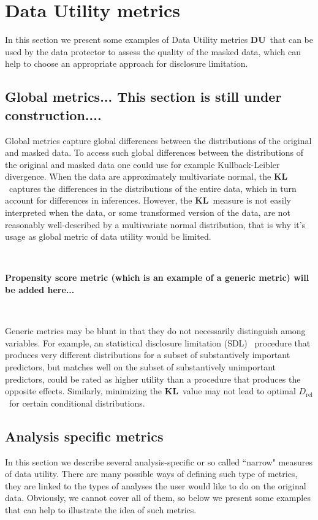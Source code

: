 \documentclass[12pt]{article}
\def\DU{\ensuremath{\mathbf{DU}}} %
\def\DBREL{\ensuremath{D_{\mathrm{rel}}}} %
\def\KL{\ensuremath{\mathbf{KL}}} %
\def\SDL{statistical disclosure limitation (SDL)%
    \gdef\SDL{SDL}}
\begin{document}
\section{ Data Utility metrics} \label{du_metrics}
In this section we present some examples of Data Utility metrics \DU\ that can be used by the data protector to assess the quality of the masked data, which can help to choose an appropriate approach for disclosure limitation.

\subsection{Global metrics... This section is still under construction.... }


Global metrics capture global differences between the distributions of the original and masked
data. To access such global differences between the distributions of the original and masked 
data one could use for example Kullback-Leibler divergence.  
When the data are approximately multivariate normal, the \KL\
captures the differences in the distributions of the entire data,
which in turn account for differences in inferences. 
However, the \KL\ measure is not easily
interpreted when the data, or some transformed version of the
data, are not reasonably well-described by a multivariate normal
distribution, that is why it's  usage as  global metric of data utility
would be limited.

$ $
 
 {\bf Propensity score metric (which is an example of a generic metric)  will be added here...}

$ $

Generic metrics may be blunt in that they do not necessarily distinguish 
among variables. For example, an \SDL\ procedure that produces very different
distributions for a subset of substantively important predictors,
but matches well on the subset of substantively unimportant
predictors, could be rated as higher utility than a procedure that
produces the opposite effects.  Similarly, minimizing the \KL\
value may not lead to optimal \DBREL\ for certain conditional
distributions.  


\subsection{Analysis specific metrics}
In this section we describe several analysis-specific or so called ``narrow" measures of data utility. There are many possible ways of defining such type of metrics,  they 
are linked to the types of analyses the user would like to do on the original data.
 Obviously, we cannot cover all of them, so below we present some examples 
 that can help to illustrate the idea of such metrics.
\end{document}

